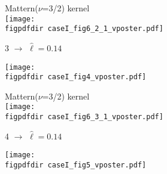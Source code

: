 \documentclass[landscape,a1,final]{a0poster} %
\def\figpdfdir{fig/} %
\begin{document}
\begin{minipage}{1\linewidth}
\begin{minipage}[t]{0.345\textwidth}
\begin{minipage}[t]{0.48\textwidth}
\begin{minipage}[t]{0.45\textwidth}
\end{minipage}
\begin{minipage}[t]{0.50\textwidth}
\vspace{-0.5cm}
\hspace{0.25\textwidth}  \tiny Mattern($\nu$=3/2) kernel\\
\texttt{[image: \\figpdfdir caseI\_fig6\_2\_1\_vposter.pdf]}

\end{minipage}

\end{minipage}


\vspace{5mm}
\hspace{-1cm}
\begin{minipage}[t]{0.48\textwidth}

\begin{minipage}[t]{0.45\textwidth}
{\large 3}\hspace{0.1cm}  $\to$ {\footnotesize$\hat{\ell}=0.14$}

\vspace{0.3cm}
\texttt{[image: \\figpdfdir caseI\_fig4\_vposter.pdf]}

\end{minipage}
\begin{minipage}[t]{0.50\textwidth}
\vspace{-0.5cm}
\hspace{0.25\textwidth}  \tiny Mattern($\nu$=3/2) kernel\\
\texttt{[image: \\figpdfdir caseI\_fig6\_3\_1\_vposter.pdf]}

\end{minipage}

\end{minipage}
\hspace{0.5cm}
\begin{minipage}[t]{0.48\textwidth}

\begin{minipage}[t]{0.45\textwidth}
{\large 4}\hspace{0.1cm}  $\to$ {\footnotesize$\hat{\ell}=0.14$}

\vspace{0.3cm}
\texttt{[image: \\figpdfdir caseI\_fig5\_vposter.pdf]}


\end{minipage}
\end{minipage}
\end{minipage}
\end{minipage}
\end{document}
